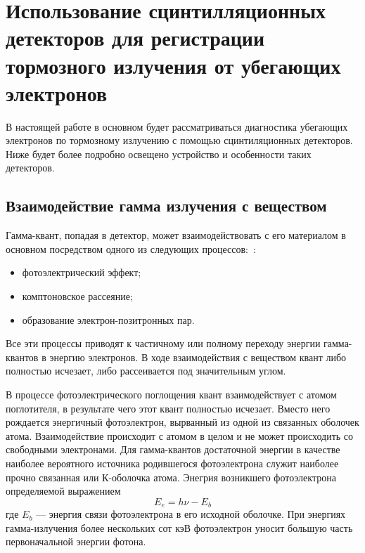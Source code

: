 
\section{Использование сцинтилляционных детекторов для регистрации тормозного излучения от убегающих электронов}

В настоящей работе в основном будет рассматриваться диагностика убегающих электронов по тормозному излучению с помощью сцинтиляционных детекторов. Ниже будет более подробно освещено устройство и особенности таких детекторов.


\subsection{ Взаимодействие гамма излучения с веществом}

Гамма-квант, попадая в детектор, может взаимодействовать с его материалом в основном посредством одного из следующих процессов:~\cite{Grozdanov2021,Knoll2010}: 
\begin{itemize}
  \item фотоэлектрический эффект;
  \item комптоновское рассеяние;
  \item образование электрон-позитронных пар.  
\end{itemize}
Все эти процессы приводят к частичному или полному переходу энергии гамма-квантов в энергию электронов. В ходе взаимодействия с веществом квант либо полностью исчезает, либо рассеивается под значительным углом.~\cite{Knoll2010}

В процессе фотоэлектрического поглощения квант взаимодействует с атомом поглотителя, в результате чего этот квант полностью исчезает. Вместо него рождается энергичный фотоэлектрон, вырванный из одной из связанных оболочек атома. Взаимодействие происходит с атомом в целом и не может происходить со свободными электронами. Для гамма-квантов достаточной энергии в качестве наиболее вероятного источника родившегося фотоэлектрона служит наиболее прочно связанная или К-оболочка атома. Энегрия возникшего фотоэлектрона определяемой выражением
\begin{equation*}
  E_e = h \nu - E_b
\end{equation*}
где $E_b$ --- энергия связи фотоэлектрона в его исходной оболочке. При энергиях гамма-излучения более нескольких сот кэВ фотоэлектрон уносит большую часть первоначальной энергии фотона. 

